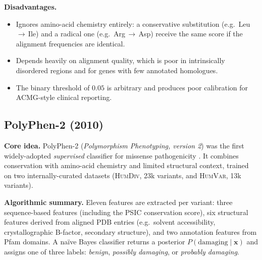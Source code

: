 \documentclass[11pt,a4paper,oneside]{report}
\begin{document}
\textbf{Disadvantages.}
\begin{itemize}[leftmargin=2em, itemsep=0.15em]
  \item Ignores amino-acid chemistry entirely: a conservative
    substitution (e.g.\ Leu\,$\rightarrow$\,Ile) and a
    radical one (e.g.\ Arg\,$\rightarrow$\,Asp) receive the
    same score if the alignment frequencies are identical.
  \item Depends heavily on alignment quality, which is poor
    in intrinsically disordered regions and for genes with
    few annotated homologues.
  \item The binary threshold of $0.05$ is arbitrary and
    produces poor calibration for ACMG-style clinical
    reporting.
\end{itemize}

\subsection{PolyPhen-2 (2010) \texorpdfstring{\citep{adzhubei2010polyphen}}{(Adzhubei et al., 2010)}}
\label{sec:rw-polyphen}

\textbf{Core idea.} PolyPhen-2 (\emph{Polymorphism
Phenotyping, version 2}) was the first widely-adopted
\emph{supervised} classifier for missense pathogenicity
\citep{adzhubei2010polyphen}. It combines conservation
with amino-acid chemistry and limited structural
context, trained on two internally-curated datasets
(\textsc{HumDiv}, 23k variants, and \textsc{HumVar},
13k variants).

\textbf{Algorithmic summary.} Eleven features are
extracted per variant: three sequence-based features
(including the PSIC conservation score), six
structural features derived from aligned PDB entries
(e.g.\ solvent accessibility, crystallographic
B-factor, secondary structure), and two annotation
features from Pfam domains. A na\"ive Bayes classifier
returns a posterior $P(\text{damaging} \mid \mathbf{x})$
and assigns one of three labels: \emph{benign},
\emph{possibly damaging}, or \emph{probably damaging}.
\end{document}
